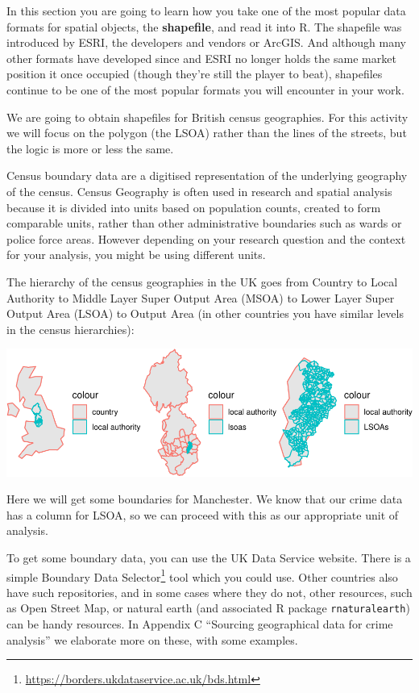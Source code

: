 \documentclass[
]{book}
\renewcommand{\href}[2]{#2\footnote{\url{#1}}}
\begin{document}
In this section you are going to learn how you take one of the most popular data formats for spatial objects, the \textbf{shapefile}, and read it into R. The shapefile was introduced by ESRI, the developers and vendors or ArcGIS. And although many other formats have developed since and ESRI no longer holds the same market position it once occupied (though they're still the player to beat), shapefiles continue to be one of the most popular formats you will encounter in your work.

We are going to obtain shapefiles for British census geographies. For this activity we will focus on the polygon (the LSOA) rather than the lines of the streets, but the logic is more or less the same.

Census boundary data are a digitised representation of the underlying geography of the census. Census Geography is often used in research and spatial analysis because it is divided into units based on population counts, created to form comparable units, rather than other administrative boundaries such as wards or police force areas. However depending on your research question and the context for your analysis, you might be using different units.

The hierarchy of the census geographies in the UK goes from Country to Local Authority to Middle Layer Super Output Area (MSOA) to Lower Layer Super Output Area (LSOA) to Output Area (in other countries you have similar levels in the census hierarchies):

\includegraphics{crime_mapping_files/figure-latex/unnamed-chunk-16-1.pdf}

Here we will get some boundaries for Manchester. We know that our crime data has a column for LSOA, so we can proceed with this as our appropriate unit of analysis.

To get some boundary data, you can use the UK Data Service website. There is a simple \href{https://borders.ukdataservice.ac.uk/bds.html}{Boundary Data Selector} tool which you could use. Other countries also have such repositories, and in some cases where they do not, other resources, such as Open Street Map, or natural earth (and associated R package \texttt{rnaturalearth}) can be handy resources. In Appendix C ``Sourcing geographical data for crime analysis'' we elaborate more on these, with some examples.
\end{document}
